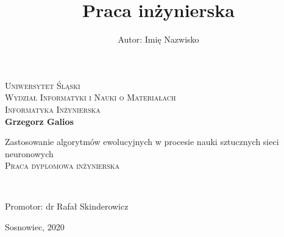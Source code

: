 
\newpage
\thispagestyle{empty}





\begin{onehalfspacing}
\begin{center}

\centering

\title{Praca inżynierska}
\author{Autor: Imię Nazwisko}


{\fontsize{17}{17}}\selectfont
\textsc{Uniwersytet Śląski \\[.3cm]
Wydział Informatyki i Nauki o Materiałach  \\[.3cm]
Informatyka Inżynierska  \\[2.5cm]}
\textbf{Grzegorz Galios \\[.3cm]}




\large 
{Zastosowanie algorytmów ewolucyjnych w procesie nauki sztucznych sieci neuronowych} \\[.5cm]
\textsc{Praca dyplomowa inżynierska}
\end{center} ~\\[3cm]

\large
\begin{flushright}
Promotor: dr Rafał Skinderowicz \\
\end{flushright}

\begin{bottompar}
\begin{flushright}
Sosnowiec, 2020
\end{flushright}
\end{bottompar}
\end{onehalfspacing}






\setcounter{page}{0} \pagestyle{plain}

\pagestyle{fancy}
